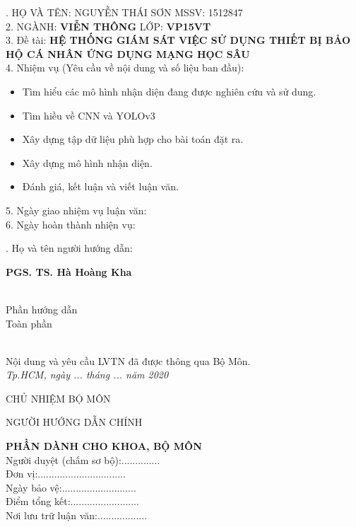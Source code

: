 \documentclass[12pt]{report}
\begin{document}
{. HỌ VÀ TÊN: NGUYỄN THÁI SƠN \hfill MSSV: 1512847\\
2. NGÀNH: \textbf{VIỄN THÔNG} \hfill LỚP: \textbf{VP15VT}\\
3. Đề tài: \textbf{HỆ THỐNG GIÁM SÁT VIỆC SỬ DỤNG THIẾT BỊ BẢO HỘ CÁ NHÂN ỨNG DỤNG MẠNG HỌC SÂU}\\
4. Nhiệm vụ (Yêu cầu về nội dung và số liệu ban đầu):
\begin{itemize}[topsep=0pt,itemsep=-1ex,partopsep=1ex,parsep=1ex]
	\item Tìm hiểu các mô hình nhận diện đang được nghiên cứu và sử dung.
	\item Tìm hiều về CNN và YOLOv3
	\item Xây dựng tập dữ liệu phù hợp cho bài toán đặt ra.
	\item Xây dựng mô hình nhận diện.
	\item Đánh giá, kết luận và viết luận văn.
\end{itemize}
5. Ngày giao nhiệm vụ luận văn:\dotfill\\
6. Ngày hoàn thành nhiện vụ:\dotfill
\linespread{0.0}\vspace{-0.7em}
\begin{multicols}{2}
	. Họ và tên người hướng dẫn:
	\begin{center}
	\dotfill \textbf{PGS. TS. Hà Hoàng Kha} \dotfill\\
	\dotfill \\
	\end{center}
	\columnbreak
	\begin{center}
	Phần hướng dẫn\\
	\dotfill Toàn phần \dotfill\\
	\dotfill \\
	\end{center}
\linespread{0.0}\vspace{-0.7em}
\end{multicols}
\noindent
Nội dung và yêu cầu LVTN đã được thông qua Bộ Môn.\\
\textit{Tp.HCM, ngày ... tháng ... năm 2020}
\begin{multicols}{2}
	\begin{center}
		CHỦ NHIỆM BỘ MÔN
	\end{center}
	\columnbreak
	\begin{center}
		NGƯỜI HƯỚNG DẪN CHÍNH
	\end{center}
\end{multicols}
\vfill
\noindent
\textbf{PHẦN DÀNH CHO KHOA, BỘ MÔN}\\
Người duyệt (chấm sơ bộ):..............\\
Đơn vị:................................\\
Ngày bảo vệ:...........................\\
Điểm tổng kết:.........................\\
Nơi lưu trữ luận văn:..................
}
\newpage
\end{document}
